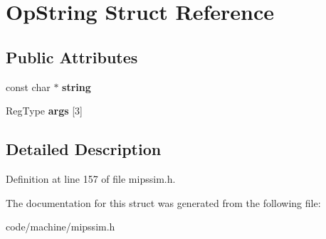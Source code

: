 \section{Op\+String Struct Reference}
\label{struct_op_string}
\subsection*{Public Attributes}
\begin{DoxyCompactItemize}
\item 
const char $\ast$ {\bfseries string}\label{struct_op_string_a342f626cc6f66e8884c31fcf8c605bd4}

\item 
Reg\+Type {\bfseries args} [3]\label{struct_op_string_abcda212d60e80e7e6fc6ec2ca2e7ff94}

\end{DoxyCompactItemize}


\subsection{Detailed Description}


Definition at line 157 of file mipssim.\+h.



The documentation for this struct was generated from the following file\+:\begin{DoxyCompactItemize}
\item 
code/machine/mipssim.\+h\end{DoxyCompactItemize}

